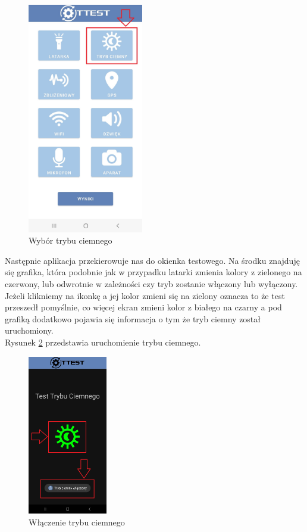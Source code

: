 \begin{figure}[!hbt]
	\begin{center}
		\includegraphics[angle=360, width=0.45\textwidth]{rys/punkt6/menu2.jpg}
		\caption{Wybór trybu ciemnego}
		\label{rys:menu2}
	\end{center}
\end{figure}

Następnie aplikacja przekierowuje nas do okienka testowego. Na środku znajduję się grafika, która podobnie jak w przypadku latarki zmienia kolory z zielonego na czerwony, lub odwrotnie w zależności czy tryb zostanie włączony lub wyłączony. Jeżeli klikniemy na ikonkę a jej kolor zmieni się na zielony oznacza to że test przeszedł pomyślnie, co więcej ekran zmieni kolor z białego na czarny a pod grafiką dodatkowo pojawia się informacja o tym że tryb ciemny został uruchomiony. \\
Rysunek \ref{rys:tryb ciemny} przedstawia uruchomienie trybu ciemnego.

\newpage


\begin{figure}[!hbt]
	\begin{center}
		\includegraphics[angle=360, width=0.31\textwidth]{rys/punkt6/tryb ciemny.png}
		\caption{Włączenie trybu ciemnego}
		\label{rys:tryb ciemny}
	\end{center}
\end{figure}

